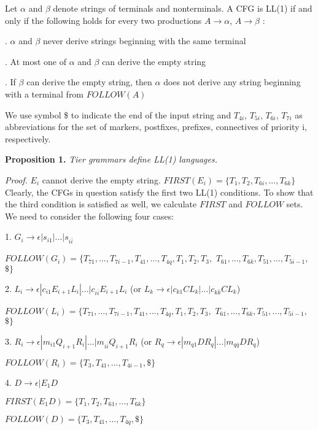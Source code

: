 \documentclass{llncs}
\begin{document}
Let $\alpha$ and $\beta$ denote strings of terminals and nonterminals. A CFG is LL(1) if and only if the following holds for every two productions $A \rightarrow \alpha$, $A \rightarrow \beta$ \cite{Aho06}:

. $\alpha$ and $\beta$ never derive strings beginning with the same terminal

. At most one of $\alpha$ and $\beta$ can derive the empty string

. If $\beta$ can derive the empty string, then $\alpha$ does not derive any string beginning with a terminal from $FOLLOW(A)$

We use symbol \$ to indicate the end of the input string and $T_{4i}$, $T_{5i}$, $T_{6i}$, $T_{7i}$ as abbreviations for the set of markers, postfixes, prefixes, connectives of priority i, respectively. 

\noindent
\textbf{Proposition 1.} \textit{Tier grammars define LL(1) languages.}

\noindent
\textit{Proof.} $E_i$ cannot derive the empty string. $FIRST(E_i) = \{ T_1, T_2, T_{6i},...,T_{6k} \}$
Clearly, the CFGs in question satisfy the first two LL(1) conditions. To show that the third condition is satisfied as well, we calculate $FIRST$ and $FOLLOW$ sets. We need to consider the following four cases:

1. $G_i \rightarrow \epsilon | s_{i1} | ... | s_{i\overline i} $

\noindent
$FOLLOW(G_i) = \{ T_{71},...,T_{7i-1}, T_{41},...,T_{4q}, T_1, T_2, T_3,$ $T_{61},...,T_{6k}, T_{51},...,T_{5i-1},$ $\$ \}$

2. $ L_i \rightarrow \epsilon | c_{i1} E_{i+1} L_i | ... | c_{i\overline i} E_{i+1} L_i$ (or $L_k \rightarrow \epsilon | c_{k1} C L_k | ... | c_{k\overline k} C L_k$)

\noindent
$FOLLOW(L_i) = \{ T_{71},...,T_{7i-1}, T_{41},...,T_{4q}, T_1, T_2, T_3,$ $T_{61},...,T_{6k}, T_{51},...,T_{5i-1},$ $\$ \}$

3. $ R_i \rightarrow \epsilon | m_{i1} Q_{i+1} R_i | ... | m_{i\overline i} Q_{i+1} R_i$ (or $R_q \rightarrow \epsilon | m_{q1} D R_q | ... | m_{q\overline q} D R_q$)

\noindent
$FOLLOW(R_i) = \{ T_3, T_{41},...,T_{4i-1}, \$ \}$

4. $D \rightarrow \epsilon | E_1 D$

\noindent
$FIRST(E_1 D) = \{ T_1, T_2, T_{61},...,T_{6k} \}$

\noindent
$FOLLOW(D) = \{ T_3, T_{41},...,T_{4q}, \$ \}$
\end{document}
